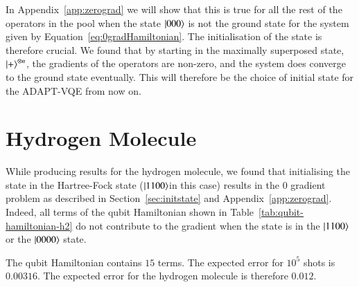 In Appendix~\ref{app:zerograd} we will show that this is true for all the rest of the operators in the pool when the state $ \ket{000}$ is not the ground state for the system given by Equation~\eqref{eq:0gradHamiltonian}. The initialisation of the state is therefore crucial. We found that by starting in the maximally superposed state, $\ket{+}^{\otimes n}$, the gradients of the operators are non-zero, and the system does converge to the ground state eventually. This will therefore be the choice of initial state for the ADAPT-VQE from now on.

\section{Hydrogen Molecule}
\label{sec:hydrogen_result}

While producing results for the hydrogen molecule, we found that initialising the state in the Hartree-Fock state ($ \ket{1100} $in this case) results in the $ 0 $ gradient problem as described in Section~\ref{sec:initstate} and Appendix~\ref{app:zerograd}. Indeed, all terms of the qubit Hamiltonian shown in Table~\ref{tab:qubit-hamiltonian-h2} do not contribute to the gradient when the state is in the $ \ket{1100} $ or the $ \ket{0000} $ state. 

The qubit Hamiltonian contains $ 15 $ terms. The expected error for $ 10^5 $ shots is $ 0.00316 $. The expected error for the hydrogen molecule is therefore $ 0.012 $. 


